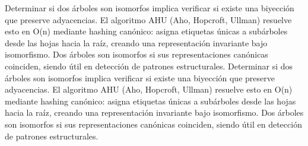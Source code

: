 \markdownRendererDocumentBegin
\markdownRendererSectionBegin
{}\markdownRendererInterblockSeparator
{}Determinar si dos árboles son isomorfos implica verificar si existe una biyección que preserve adyacencias. El algoritmo \markdownRendererDollarSign{}AHU (Aho, Hopcroft, Ullman)\markdownRendererDollarSign{} resuelve esto en \markdownRendererDollarSign{}O(n)\markdownRendererDollarSign{} mediante hashing canónico: asigna etiquetas únicas a subárboles desde las hojas hacia la raíz, creando una representación invariante bajo isomorfismo. Dos árboles son isomorfos si sus representaciones canónicas coinciden, siendo útil en detección de patrones estructurales.\markdownRendererInterblockSeparator
{}
\markdownRendererSectionEnd \markdownRendererDocumentEnd\markdownRendererDocumentBegin
\markdownRendererSectionBegin
{}\markdownRendererInterblockSeparator
{}Determinar si dos árboles son isomorfos implica verificar si existe una biyección que preserve adyacencias. El algoritmo \markdownRendererDollarSign{}AHU (Aho, Hopcroft, Ullman)\markdownRendererDollarSign{} resuelve esto en \markdownRendererDollarSign{}O(n)\markdownRendererDollarSign{} mediante hashing canónico: asigna etiquetas únicas a subárboles desde las hojas hacia la raíz, creando una representación invariante bajo isomorfismo. Dos árboles son isomorfos si sus representaciones canónicas coinciden, siendo útil en detección de patrones estructurales.\markdownRendererInterblockSeparator
{}
\markdownRendererSectionEnd \markdownRendererDocumentEnd
